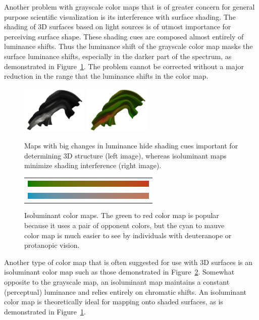 \documentclass[review,journal]{vgtc}         %
\begin{document}

Another problem with grayscale color maps that is of greater concern for
general purpose scientific visualization is its interference with surface
shading.  The shading of 3D surfaces based on light sources is of utmost
importance for perceiving surface shape.  These shading cues are
composed almost entirely of luminance shifts.  Thus the luminance shift of
the grayscale color map masks the surface luminance shifts, especially in
the darker part of the spectrum, as demonstrated in
Figure~\ref{fig:LuminanceVsShading}.  The problem cannot be corrected
without a major reduction in the range that the luminance shifts in the color
map.

\begin{figure}
  \centering
  \includegraphics[width=1.25in]{images/GrayscaleShading}
  \includegraphics[width=1.25in]{images/Green2RedShading}
  \caption{Maps with big changes in luminance hide shading cues important
    for determining 3D structure (left image), whereas isoluminant maps
    minimize shading interference (right image).}
  \label{fig:LuminanceVsShading}
\end{figure}

\begin{figure}
  \centering
  \begin{tabular}{c}
    \includegraphics[width=2.5in]{images/Green2RedBar} \\
    \includegraphics[width=2.5in]{images/Cyan2MauveBar}
  \end{tabular}
  \caption{Isoluminant color maps.  The green to red color map is popular
    because it uses a pair of opponent colors, but the cyan to mauve color
    map is much easier to see by individuals with deuteranope or protanopic
    vision.}
  \label{fig:IsoluminantColorMap}
\end{figure}
Another type of color map that is often suggested for use with 3D surfaces
is an isoluminant color map such as those demonstrated in
Figure~\ref{fig:IsoluminantColorMap}.  Somewhat opposite to the grayscale
map, an isoluminant map maintains a constant (perceptual) luminance and
relies entirely on chromatic shifts.  An isoluminant color map is
theoretically ideal for mapping onto shaded surfaces, as is demonstrated in
Figure~\ref{fig:LuminanceVsShading}.
\end{document}
